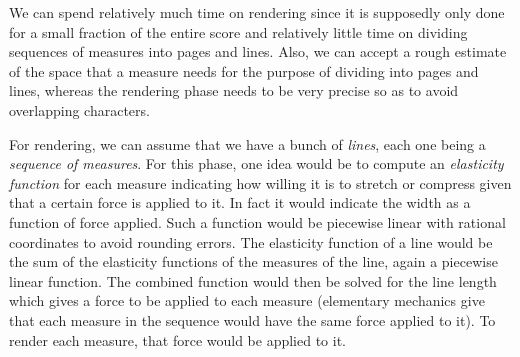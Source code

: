 We can spend relatively much time on rendering since it is supposedly
only done for a small fraction of the entire score and relatively
little time on dividing sequences of measures into pages and lines.
Also, we can accept a rough estimate of the space that a measure needs
for the purpose of dividing into pages and lines, whereas the
rendering phase needs to be very precise so as to avoid overlapping
characters. 

For rendering, we can assume that we have a bunch of \emph{lines},
each one being a \emph{sequence of measures}.  For this phase, one
idea would be to compute an \emph{elasticity function} for each
measure indicating how willing it is to stretch or compress given that
a certain force is applied to it.  In fact it would indicate the width
as a function of force applied.  Such a function would be piecewise
linear with rational coordinates to avoid rounding errors.  The
elasticity function of a line would be the sum of the elasticity
functions of the measures of the line, again a piecewise linear
function.  The combined function would then be solved for the line
length which gives a force to be applied to each measure (elementary
mechanics give that each measure in the sequence would have the same
force applied to it).  To render each measure, that force would be
applied to it.  

